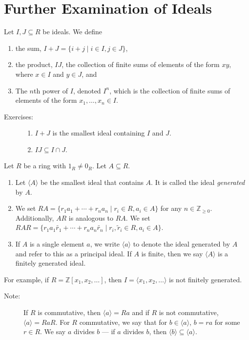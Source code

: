 \documentclass[10pt]{extarticle}
\newcommand{\Z}{\mathbb{Z}}
\begin{document}
  \section{Further Examination of Ideals}%
  Let $I,J\subseteq R$ be ideals. We define
  \begin{enumerate}[(1)]
    \item the sum, $I+J = \{i+j\mid i\in I,j\in J\}$,
    \item the product, $IJ$, the collection of finite sums of elements of the form $xy$, where $x\in I$ and $y\in J$, and
    \item The $n$th power of $I$, denoted $I^n$, which is the collection of finite sums of elements of the form $x_1,\dots,x_n\in I$.
  \end{enumerate}
  \begin{description}
    \item[Exercises:]\hfill
      \begin{enumerate}[(1)]
        \item $I+J$ is the smallest ideal containing $I$ and $J$.
        \item $IJ\subseteq I\cap J$.
      \end{enumerate}
  \end{description}
  Let $R$ be a ring with $1_R\neq 0_R$. Let $A\subseteq R$.
  \begin{enumerate}[(1)]
    \item Let $\langle A\rangle$ be the smallest ideal that contains $A$. It is called the ideal \textit{generated} by $A$.
    \item We set $RA = \{r_1a_1 + \cdots + r_na_n\mid r_i\in R, a_i\in A\}$ for any $n\in \Z_{\geq 0}$. Additionally, $AR$ is analogous to $RA$. We set $RAR = \{r_1a_1\tilde{r_1} + \cdots + r_na_n\tilde{r_n}\mid r_i,\tilde{r}_i\in R, a_i\in A\}$.
    \item If $A$ is a single element $a$, we write $\langle a \rangle$ to denote the ideal generated by $A$ and refer to this as a principal ideal. If $A$ is finite, then we say $\langle A \rangle$ is a finitely generated ideal.
  \end{enumerate}
  For example, if $R = \Z[x_1,x_2,\dots]$, then $I = \langle x_1,x_2,\dots\rangle$ is not finitely generated.
  \begin{description}
    \item[Note:] If $R$ is commutative, then $\langle a \rangle = Ra$ and if $R$ is not commutative, $\langle a \rangle = RaR$. For $R$ commutative, we say that for $b\in \langle a \rangle$, $b = ra$ for some $r\in R$. We say $a$ divides $b$ --- if $a$ divides $b$, then $\langle b \rangle\subseteq \langle a \rangle$.
  \end{description}
\end{document}
